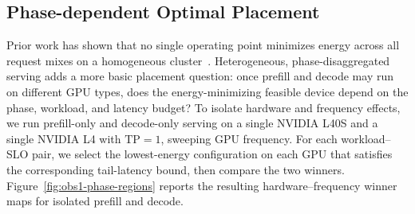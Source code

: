 


\subsection{Phase-dependent Optimal Placement}
\label{sec:motivation:heterogeneity}

Prior work has shown that no single operating point minimizes energy across all request mixes on a homogeneous cluster~\cite{stojkovic2024dynamollm}. 
Heterogeneous, phase-disaggregated serving adds a more basic placement question: once prefill and decode may run on different GPU types, does the energy-minimizing feasible device depend on the phase, workload, and latency budget?
To isolate hardware and frequency effects, we run prefill-only and decode-only serving on a single NVIDIA L40S and a single NVIDIA L4 with $\mathrm{TP}{=}1$, sweeping GPU frequency. 
For each workload--SLO pair, we select the lowest-energy configuration on each GPU that satisfies the corresponding tail-latency bound, then compare the two winners. 
Figure~\ref{fig:obs1-phase-regions} reports the resulting hardware--frequency winner maps for isolated prefill and decode.

